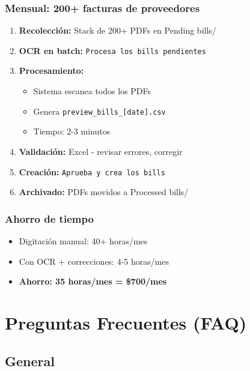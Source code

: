 \documentclass[12pt,oneside]{article}
\begin{document}
\subsubsection{Mensual: 200+ facturas de proveedores}

\begin{enumerate}
    \item \textbf{Recolección:} Stack de 200+ PDFs en Pending bills/
    \item \textbf{OCR en batch:} \texttt{Procesa los bills pendientes}
    \item \textbf{Procesamiento:}
    \begin{itemize}
        \item Sistema escanea todos los PDFs
        \item Genera \texttt{preview\_bills\_[date].csv}
        \item Tiempo: 2-3 minutos
    \end{itemize}
    \item \textbf{Validación:} Excel - revisar errores, corregir
    \item \textbf{Creación:} \texttt{Aprueba y crea los bills}
    \item \textbf{Archivado:} PDFs movidos a Processed bills/
\end{enumerate}

\subsubsection{Ahorro de tiempo}

\begin{itemize}
    \item Digitación manual: 40+ horas/mes
    \item Con OCR + correcciones: 4-5 horas/mes
    \item \textbf{Ahorro: 35 horas/mes = \$700/mes}
\end{itemize}

\newpage

\section{Preguntas Frecuentes (FAQ)}

\subsection{General}
\end{document}
